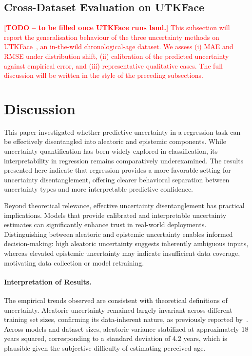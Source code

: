 \documentclass[runningheads]{llncs}
\begin{document}
\subsection{Cross-Dataset Evaluation on UTKFace}
\label{sec:utkface}

\textcolor{red}{\textbf{[TODO -- to be filled once UTKFace runs land.]} This subsection will report the generalisation behaviour of the three uncertainty methods on UTKFace~\cite{zhang2017utkface}, an in-the-wild chronological-age dataset. We assess (i) MAE and RMSE under distribution shift, (ii) calibration of the predicted uncertainty against empirical error, and (iii) representative qualitative cases. The full discussion will be written in the style of the preceding subsections.}

\section{Discussion}
\label{sec:discussion}

This paper investigated whether predictive uncertainty in a regression task can be effectively disentangled into aleatoric and epistemic components. While uncertainty quantification has been widely explored in classification, its interpretability in regression remains comparatively underexamined. The results presented here indicate that regression provides a more favorable setting for uncertainty disentanglement, offering clearer behavioral separation between uncertainty types and more interpretable predictive confidence.

Beyond theoretical relevance, effective uncertainty disentanglement has practical implications. Models that provide calibrated and interpretable uncertainty estimates can significantly enhance trust in real-world deployments. Distinguishing between aleatoric and epistemic uncertainty enables informed decision-making: high aleatoric uncertainty suggests inherently ambiguous inputs, whereas elevated epistemic uncertainty may indicate insufficient data coverage, motivating data collection or model retraining.

\paragraph{Interpretation of Results.}
The empirical trends observed are consistent with theoretical definitions of uncertainty. Aleatoric uncertainty remained largely invariant across different training set sizes, confirming its data-inherent nature, as previously reported by~\cite{kendall2017uncertainties}. Across models and dataset sizes, aleatoric variance stabilized at approximately 18 years squared, corresponding to a standard deviation of 4.2 years, which is plausible given the subjective difficulty of estimating perceived age.
\end{document}
